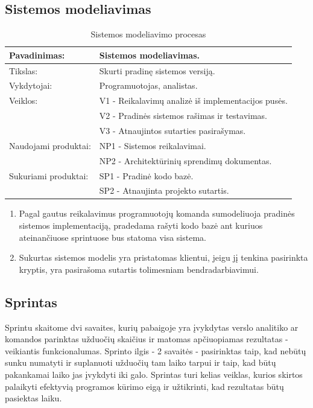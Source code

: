 \documentclass{VUMIFPSkursinis}
\begin{document}
	\subsection{Sistemos modeliavimas}
	\begin{center}
		\begin{table}[ht]
			\caption{Sistemos modeliavimo procesas}
		\begin{tabular}{ | l | l | } 
		\hline
	Pavadinimas:         & Sistemos modeliavimas.          		 					 \\ \hline
	Tikslas: 	           & Skurti pradinę sistemos versiją. 																	\\ \hline
	Vykdytojai:          & Programuotojas, analistas.  \\ \hline
	Veiklos:             & V1 - Reikalavimų analizė iš implementacijos pusės. 		          \\
											 & V2 - Pradinės sistemos rašimas ir testavimas.					             \\
											 & V3 - Atnaujintos sutarties pasirašymas.									          \\ \hline
	Naudojami produktai: & NP1 - Sistemos reikalavimai. 													  \\
											 & NP2 - Architektūrinių sprendimų dokumentas. \\ \hline
	Sukuriami produktai: & SP1 - Pradinė kodo bazė. 																	          \\
											 & SP2 - Atnaujinta projekto sutartis.										           \\ \hline
\end{tabular}
\end{table}
\end{center}

\begin{enumerate} 
	\item Pagal gautus reikalavimus programuotojų komanda sumodeliuoja pradinės sistemos implementaciją, pradedama rašyti kodo bazė ant kuriuos ateinančiuose sprintuose bus statoma visa sistema.
	\item Sukurtas sistemos modelis yra pristatomas klientui, jeigu jį tenkina pasirinkta kryptis, yra pasirašoma sutartis tolimesniam bendradarbiavimui.
\end{enumerate}
		
	\subsection{Sprintas}
	Sprintu skaitome dvi savaites, kurių pabaigoje yra įvykdytas verslo analitiko ar komandos parinktas užduočių skaičius ir matomas apčiuopiamas rezultatas - veikiantis funkcionalumas. Sprinto ilgis - 2 savaitės - pasirinktas taip, kad nebūtų sunku numatyti ir suplanuoti užduočių tam laiko tarpui ir taip, kad būtų pakankamai laiko jas įvykdyti iki galo. Sprintas turi kelias veiklas, kurios skirtos palaikyti efektyvią programos kūrimo eigą ir užtikrinti, kad rezultatas būtų pasiektas laiku.
\end{document}

